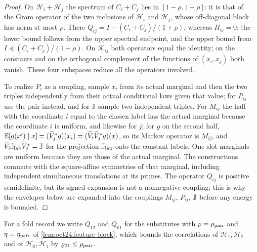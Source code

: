 \begin{proof}
On $\mathcal H_i+\mathcal H_j$ the spectrum of $C_i+C_j$ lies in $[1-\rho,1+\rho]$: it is
that of the Gram operator of the two inclusions of $\mathcal H_i$ and $\mathcal H_j$,
whose off-diagonal block has norm at most $\rho$. There
$Q_{ij}=I-(C_i+C_j)/(1+\rho)$, whereas $\Pi_{ij}=0$; the lower bound follows from
the upper spectral endpoint, and the upper bound from
$I\preceq(C_i+C_j)/(1-\rho)$. On $\mathcal K_{ij}$ both operators equal the identity;
on the constants and on the orthogonal complement of the functions of
$(x_i,x_j)$ both vanish. These four subspaces reduce all the operators
involved.

To realize $P_i$ as a coupling, sample $x_i$ from its actual marginal and then
the two triples independently from their actual conditional laws given that
value; for $P_{ij}$ use the pair instead, and for $\mathbb J$ sample two
independent triples. For $M_{ij}$ the half with the coordinate $i$ equal to the
chosen label has the actual marginal because the coordinate $i$ is uniform, and
likewise for $j$; for $g$ on the second half,
$\mathbb E[g(x')\mid x]=(\widetilde V_j^*g)(x_i)=(\widetilde V_i\widetilde V_j^*g)(x)$, so its Markov operator is $M_{ij}$,
and $\widetilde V_i\mathbb J_{\rm lab}\widetilde V_j^*=\mathbb J$ for the projection $\mathbb J_{\rm lab}$ onto the
constant labels. One-slot marginals are uniform because they are those of the
actual marginal. The constructions commute with the square-affine symmetries of
that marginal, including independent simultaneous translations at its primes. The
operator $Q_{ij}$ is positive semidefinite, but its signed expansion is not a
nonnegative coupling; this is why the envelopes below are expanded into the
couplings $M_{ij}$, $P_{ij}$, $\mathbb J$ before any energy is bounded.
\end{proof}

For a fold record we write $Q_{12}$ and $Q_{01}$ for the substitutes with
$\rho=\rho_{\rm pair}$ and $\eta=\eta_{\rm pair}$ of \cref{lem:oct24:feature-block},
which bounds the correlations of $\mathcal H_1,\mathcal H_2$ and of $\mathcal H_0,\mathcal H_1$
by $\varrho_{01}\le\rho_{\rm pair}$.

